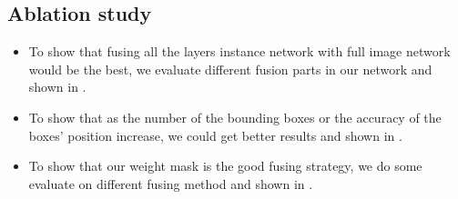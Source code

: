 {\subsection{Ablation study}
\label{sec:ablation}

\begin{itemize}
    \item To show that fusing all the layers instance network with full image network would be the best, we evaluate different fusion parts in our network and shown in .
    \item To show that as the number of the bounding boxes or the accuracy of the boxes' position increase, we could get better results and shown in .
    \item To show that our weight mask is the good fusing strategy, we do some evaluate on different fusing method and shown in .
\end{itemize}

}
